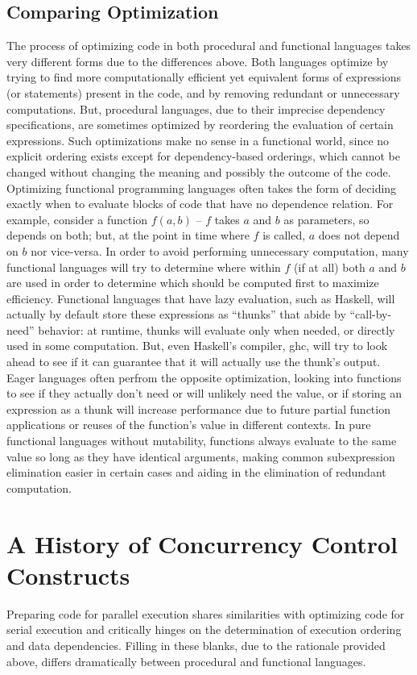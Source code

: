 \subsection{Comparing Optimization}
The process of optimizing code in both procedural and functional languages takes
very different forms due to the differences above. Both languages optimize by
trying to find more computationally efficient yet equivalent forms of
expressions (or statements) present in the code, and by removing redundant or
unnecessary computations. But, procedural languages, due to their imprecise
dependency specifications, are sometimes optimized by reordering the evaluation
of certain expressions. Such optimizations make no sense in a functional world,
since no explicit ordering exists except for dependency-based orderings, which
cannot be changed without changing the meaning and possibly the outcome of the
code. Optimizing functional programming languages often takes the form of
deciding exactly when to evaluate blocks of code that have no dependence
relation. For example, consider a function $f(a,b)$ -- $f$ takes $a$ and $b$ as
parameters, so depends on both; but, at the point in time where $f$ is called,
$a$ does not depend on $b$ nor vice-versa. In order to avoid performing
unnecessary computation, many functional languages will try to determine where
within $f$ (if at all) both $a$ and $b$ are used in order to determine which
should be computed first to maximize efficiency. Functional languages that have
lazy evaluation, such as Haskell, will actually by default store these
expressions as ``thunks'' that abide by ``call-by-need'' behavior: at runtime,
thunks will evaluate only when needed, or directly used in some computation.
But, even Haskell's compiler, ghc, will try to look ahead to see if it can
guarantee that it will actually use the thunk's output. Eager languages often
perfrom the opposite optimization, looking into functions to see if they
actually don't need or will unlikely need the value, or if storing an expression
as a thunk will increase performance due to future partial function applications
or reuses of the function's value in different contexts. In pure functional
languages without mutability, functions always evaluate to the same value so
long as they have identical arguments, making common subexpression elimination
easier in certain cases and aiding in the elimination of redundant computation.

\section{A History of Concurrency Control Constructs}
Preparing code for parallel execution shares similarities with optimizing code
for serial execution and critically hinges on the determination of execution
ordering and data dependencies. Filling in these blanks, due to the rationale
provided above, differs dramatically between procedural and functional
languages.


